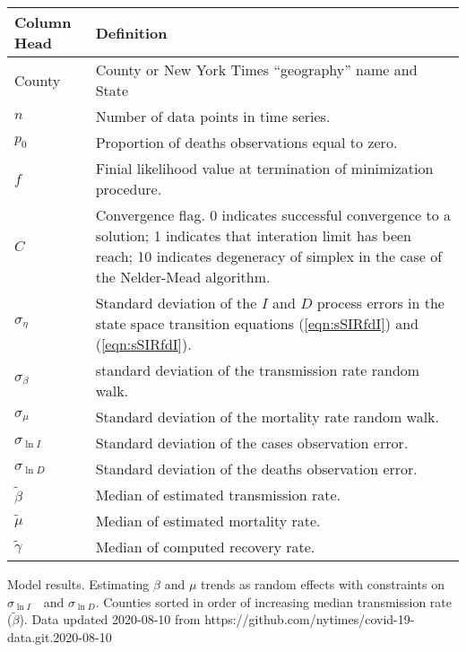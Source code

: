 \documentclass[12pt,letterpaper]{article}
\newcommand\slI{$\sigma_{\ln I}$\ }
\newcommand\slD{$\sigma_{\ln D}$}
\begin{document}
\begin{appendices}
\begin{table}[!ht]
\caption{\label{tab:colheads}
}
\begin{tabular}{ll}
\hline
Column Head & Definition\\
\hline
County & County or New York Times ``geography'' name and State\\
$n$ & Number of data points in time series.\\
$p_0$ &  Proportion of deaths observations equal to zero.\\
$f$ & Finial likelihood value at termination of minimization
procedure.\\
$C$ & Convergence flag. 0 indicates successful convergence to a
solution; 1 indicates that interation limit has been reach; 10
indicates degeneracy of simplex in the case of the Nelder-Mead
algorithm.\\
$\sigma_\eta$ & Standard deviation of the $I$ and $D$ process errors in the state
space transition equations (\ref{eqn:sSIRfdI}) and
(\ref{eqn:sSIRfdI}).\\
$\sigma_\beta$ & standard deviation of the transmission rate random
walk.\\
$\sigma_\mu$ & Standard deviation of the mortality rate random walk.\\
$\sigma_{\ln I}$ & Standard deviation of the cases observation error.\\
$\sigma_{\ln D}$ & Standard deviation of the deaths observation error.\\
$\tilde{\beta}$ & Median of estimated transmission rate.\\
$\tilde{\mu}$ & Median of estimated mortality rate.\\
$\tilde\gamma$ & Median of computed recovery rate.\\
\hline

\end{tabular}

\end{table}



\begin{sidewaystable}
\caption{\label{tab:cons}
Model results. Estimating $\beta$ and $\mu$ trends as random effects with 
constraints on \slI\  and \slD.
Counties sorted in order of increasing median transmission rate ($\tilde\beta$).
Data updated 2020-08-10 from https://github.com/nytimes/covid-19-data.git.2020-08-10
}
\centering
{\scriptsize

}
\end{sidewaystable}
\end{appendices}
\end{document}
